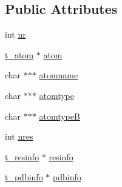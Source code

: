 \subsection*{\-Public \-Attributes}
\begin{DoxyCompactItemize}
\item 
int \hyperlink{structt__atoms_a3a326d8bb4b00bd2fd5aecbd10ea3493}{nr}
\item 
\hyperlink{structt__atom}{t\-\_\-atom} $\ast$ \hyperlink{structt__atoms_ac3708914e96b52388974827b0cb3b95e}{atom}
\item 
char $\ast$$\ast$$\ast$ \hyperlink{structt__atoms_a1c7d1e30ef9db30f8ee6c99c72d35b07}{atomname}
\item 
char $\ast$$\ast$$\ast$ \hyperlink{structt__atoms_a6bfa61df89fa0a2c40fc861a2c0cccea}{atomtype}
\item 
char $\ast$$\ast$$\ast$ \hyperlink{structt__atoms_af5db37924f454f3a5b3f5ddc487d2a1b}{atomtype\-B}
\item 
int \hyperlink{structt__atoms_a22eaee982f6e5be974be4d49f0d90745}{nres}
\item 
\hyperlink{structt__resinfo}{t\-\_\-resinfo} $\ast$ \hyperlink{structt__atoms_a1ef118b1571b8f575d9ee1cf720ae513}{resinfo}
\item 
\hyperlink{structt__pdbinfo}{t\-\_\-pdbinfo} $\ast$ \hyperlink{structt__atoms_a97d641cab3bc0c5a3d78c800f45201e1}{pdbinfo}
\end{DoxyCompactItemize}


